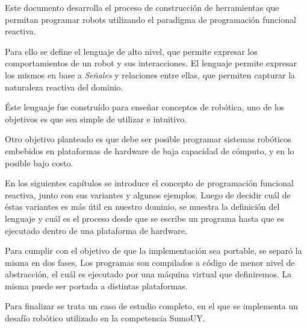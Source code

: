 
  Este documento desarrolla el proceso de construcción de
herramientas
que permitan programar robots utilizando el paradigma de
programación funcional reactiva.

  Para ello se define el lenguaje \frob{} de alto nivel,
que permite expresar los comportamientos de un robot y sus
interacciones.
  El lenguaje permite expresar los mismos en base a
\emph{Señales} y relaciones entre ellas, que permiten
capturar la naturaleza reactiva del dominio.

  Éste lenguaje fue construído para
enseñar conceptos de robótica,
uno de los objetivos es que sea simple de
utilizar e intuitivo.

  Otro objetivo planteado es que debe ser posible programar
sistemas robóticos embebidos en plataformas de
hardware de baja capacidad de cómputo, y en lo posible
bajo costo.

  En los siguientes capítulos se introduce el concepto de
programación funcional reactiva, junto con sus variantes y
algunos ejemplos.
  Luego de decidir cuál de éstas variantes es más útil
en nuestro dominio, se muestra la definición del lenguaje
\frob{} y cuál es el proceso desde que se escribe un programa
hasta que es ejecutado dentro de una plataforma de hardware.

  Para cumplir con el objetivo de que la implementación sea
portable, se separó la misma en dos fases. Los programas son
compilados a código \alf{} de menor nivel de abstracción,
el cuál es ejecutado por una máquina virtual que definiremos.
  La misma puede ser portada a distintas plataformas.

  Para finalizar se trata un caso de estudio completo, en el
que se implementa un desafío robótico utilizado en la competencia
SumoUY.
